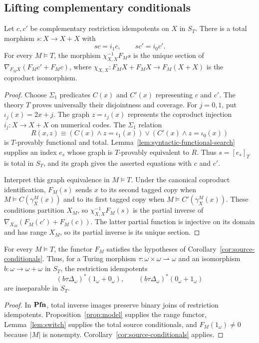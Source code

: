\subsection{Lifting complementary conditionals}

\begin{lemma}\label{lem:switch}
Let $c,c'$ be complementary restriction idempotents on $X$ in $S_T$.
There is a total morphism $s:X\to X+X$ with
\[
 sc=i_1c,\qquad sc'=i_0c'.
\]
For every $M\models T$, the morphism $\chi_{X,X}^{-1}F_Ms$ is the
unique section of $\nabla_{F_MX}(F_Mc'+F_Mc)$, where
$\chi_{X,X}:F_MX+F_MX\to F_M(X+X)$ is the coproduct isomorphism.
\end{lemma}
\begin{proof}
Choose $\Sigma_1$ predicates $C(x)$ and $C'(x)$ representing
$c$ and $c'$.
The theory $T$ proves universally their disjointness and coverage.
For $j=0,1$, put $\iota_j(x)=2x+j$. The graph
$z=\iota_j(x)$ represents the coproduct injection
$i_j:X\to X+X$ on numerical codes.
The $\Sigma_1$ relation
\[
 R(x,z)\equiv
 (C(x)\land z=\iota_1(x))\lor(C'(x)\land z=\iota_0(x))
\]
is $T$-provably functional and total.
Lemma~\ref{lem:syntactic-functional-search} supplies an index $e_s$
whose graph is $T$-provably equivalent to $R$. Thus $s=[e_s]_T$
is total in $S_T$, and its graph gives the asserted equations with
$c$ and $c'$.

Interpret this graph equivalence in $M\models T$.
Under the canonical coproduct identification, $F_M(s)$ sends
$x$ to its second tagged copy when
$M\models C(\gamma_X^M(x))$ and to its first tagged copy when
$M\models C'(\gamma_X^M(x))$.
These conditions partition $X_M$, so
$\chi_{X,X}^{-1}F_M(s)$ is the partial inverse of
$\nabla_{X_M}(F_M(c')+F_M(c))$. The latter partial function is injective
on its domain and has range $X_M$, so its partial inverse is its
unique section.
\end{proof}

\begin{corollary}\label{cor:model-pair}
For every $M\models T$, the functor $F_M$ satisfies the hypotheses of
Corollary~\ref{cor:source-conditionals}. Thus, for a Turing morphism
$\tau:\omega\times\omega\rightharpoonup\omega$ and an isomorphism
$b:\omega\to\omega+\omega$ in $S_T$, the restriction idempotents
\[
 (b\tau\Delta_\omega)^*(1_\omega+0_\omega),\qquad
 (b\tau\Delta_\omega)^*(0_\omega+1_\omega)
\]
are inseparable in $S_T$.
\end{corollary}
\begin{proof}
In $\mathbf{Pfn}$, total inverse images preserve binary joins of restriction
idempotents. Proposition~\ref{prop:model} supplies the range functor,
Lemma~\ref{lem:switch} supplies the total source conditionals, and
$F_M(1_\omega)\ne0$ because $|M|$ is nonempty.
Corollary~\ref{cor:source-conditionals} applies.
\end{proof}


